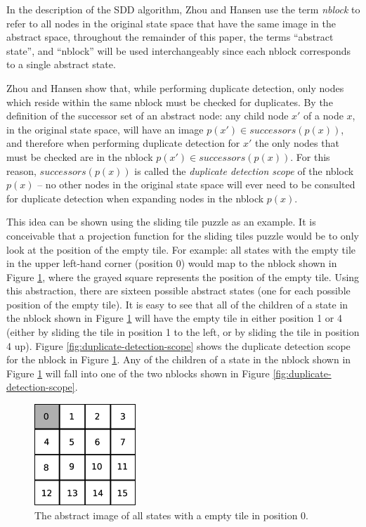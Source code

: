 \documentclass{article} \usepackage{aaai} \usepackage{graphicx}
\begin{document}
In the description of the SDD algorithm, Zhou and Hansen use the term
\emph{nblock} to refer to all nodes in the original state space that
have the same image in the abstract space, throughout the remainder of
this paper, the terms ``abstract state'', and ``nblock'' will be used
interchangeably since each nblock corresponds to a single abstract
state.

Zhou and Hansen show that, while performing duplicate detection, only
nodes which reside within the same nblock must be checked for
duplicates.  By the definition of the successor set of an abstract
node: any child node $x'$ of a node $x$, in the original state space,
will have an image $p(x') \in successors(p(x))$, and therefore when
performing duplicate detection for $x'$ the only nodes that must be
checked are in the nblock $p(x') \in successors(p(x))$.  For this
reason, $successors(p(x))$ is called the \emph{duplicate detection
  scope} of the nblock $p(x)$ -- no other nodes in the original state
space will ever need to be consulted for duplicate detection when
expanding nodes in the nblock $p(x)$.

This idea can be shown using the sliding tile puzzle as an example.
It is conceivable that a projection function for the sliding tiles
puzzle would be to only look at the position of the empty tile.  For
example: all states with the empty tile in the upper left-hand corner
(position 0) would map to the nblock shown in Figure
\ref{fig:tile-abstraction}, where the grayed square represents the
position of the empty tile.  Using this abstraction, there are sixteen
possible abstract states (one for each possible position of the empty
tile).  It is easy to see that all of the children of a state in the
nblock shown in Figure \ref{fig:tile-abstraction} will have the empty
tile in either position 1 or 4 (either by sliding the tile in position
1 to the left, or by sliding the tile in position 4 up).  Figure
\ref{fig:duplicate-detection-scope} shows the duplicate detection
scope for the nblock in Figure \ref{fig:tile-abstraction}.  Any of the
children of a state in the nblock shown in Figure
\ref{fig:tile-abstraction} will fall into one of the two nblocks shown
in Figure \ref{fig:duplicate-detection-scope}.

\begin{figure}[t]
\begin{center}
\includegraphics[width=1.5in]{images/tile-abstraction.eps}
\caption{The abstract image of all states with a empty tile in
  position 0.}
\label{fig:tile-abstraction}
\end{center}
\end{figure}
\end{document}
